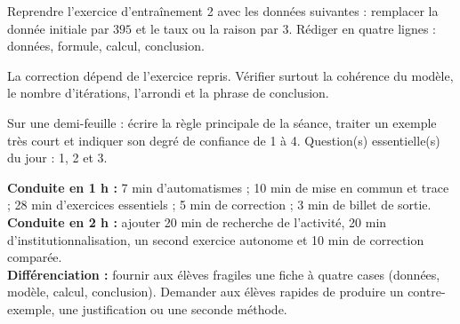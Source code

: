
\begin{homework}Reprendre l'exercice d'entraînement 2 avec les données suivantes : remplacer la donnée initiale par $395$ et le taux ou la raison par $3$. Rédiger en quatre lignes : données, formule, calcul, conclusion.\end{homework}
\begin{solution}La correction dépend de l'exercice repris. Vérifier surtout la cohérence du modèle, le nombre d'itérations, l'arrondi et la phrase de conclusion.\end{solution}

\begin{exitticket}[3 minutes]Sur une demi-feuille : écrire la règle principale de la séance, traiter un exemple très court et indiquer son degré de confiance de 1 à 4. Question(s) essentielle(s) du jour : 1, 2 et 3.\end{exitticket}

\ifmxteacher
\begin{method}
\textbf{Conduite en 1 h :} 7 min d'automatismes ; 10 min de mise en commun et trace ; 28 min d'exercices essentiels ; 5 min de correction ; 3 min de billet de sortie.\\
\textbf{Conduite en 2 h :} ajouter 20 min de recherche de l'activité, 20 min d'institutionnalisation, un second exercice autonome et 10 min de correction comparée.\\
\textbf{Différenciation :} fournir aux élèves fragiles une fiche à quatre cases (données, modèle, calcul, conclusion). Demander aux élèves rapides de produire un contre-exemple, une justification ou une seconde méthode.
\end{method}
\fi
